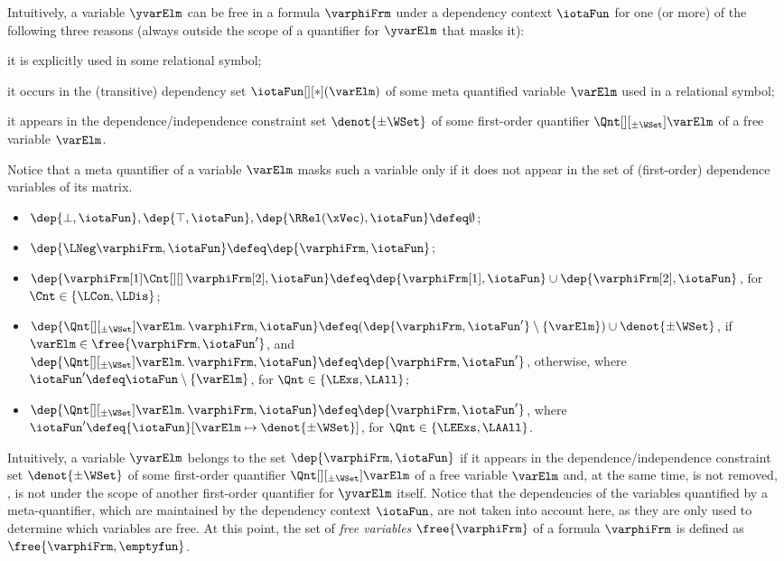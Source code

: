 \documentclass[authoryear]{elsarticle}
\begin{document}
Intuitively, a variable $\yvarElm$ can be free in a \Meta formula $\varphiFrm$
under a dependency context $\iotaFun$ for one (or more) of the following three
reasons (always outside the scope of a quantifier for $\yvarElm$ that masks it):
\begin{inparaenum}[(i)]
  \item
    it is explicitly used in some relational symbol;
  \item
    it occurs in the (transitive) dependency set $\iotaFun[][*](\varElm)$ of
    some meta quantified variable $\varElm$ used in a relational symbol;
  \item
    it appears in the dependence/independence constraint set $\denot{\pm\WSet}$
    of some first-order quantifier $\Qnt[][_{\pm\WSet}] \varElm$ of a free
    variable $\varElm$.
\end{inparaenum}
Notice that a meta quantifier of a variable $\varElm$ masks such a variable
only if it does not appear in the set of (first-order) dependence variables of
its matrix.
%
\begin{itemize}[$\bullet$]
\item
  $\dep{\bot, \iotaFun}, \dep{\top, \iotaFun}, \dep{\RRel(\xVec), \iotaFun}
  \defeq \emptyset$;
\item
  $\dep{\LNeg \varphiFrm, \iotaFun} \defeq \dep{\varphiFrm, \iotaFun}$;
\item
  $\dep{\varphiFrm[1] \Cnt[][]\, \varphiFrm[2], \iotaFun} \defeq
  \dep{\varphiFrm[1], \iotaFun} \cup \dep{\varphiFrm[2], \iotaFun}$, for $\Cnt
  \in \{ \LCon, \LDis \}$;
\item
  $\dep{\Qnt[][_{\pm\WSet}] \varElm \ldotp \varphiFrm, \iotaFun} \defeq
  (\dep{\varphiFrm, \iotaFun'} \setminus \{ \varElm \}) \cup \denot{\pm\WSet}$,
  if $\varElm \in \free{\varphiFrm, \iotaFun'}$, and $\dep{\Qnt[][_{\pm\WSet}]
  \varElm \ldotp \varphiFrm, \iotaFun} \allowbreak \defeq \dep{\varphiFrm,
  \iotaFun'}$, otherwise, where $\iotaFun' \defeq  \iotaFun \setminus \{
  \varElm \}$, for $\Qnt \in \{ \LExs, \LAll \}$;
\item
  $\dep{\Qnt[][_{\pm\WSet}] \varElm \ldotp \varphiFrm, \iotaFun} \defeq
  \dep{\varphiFrm, \iotaFun'}$, where $\iotaFun' \defeq {\iotaFun}[\varElm
  \mapsto \denot{\pm\WSet}]$, for $\Qnt \in \{ \LEExs, \LAAll \}$.
\end{itemize}
Intuitively, a variable $\yvarElm$ belongs to the set $\dep{\varphiFrm,
\iotaFun}$ if it appears in the dependence/independence constraint set
$\denot{\pm\WSet}$ of some first-order quantifier $\Qnt[][_{\pm\WSet}] \varElm$
of a free variable $\varElm$ and, at the same time, is not removed, \ie, is not
under the scope of another first-order quantifier for $\yvarElm$ itself.
Notice that the dependencies of the variables quantified by a meta-quantifier,
which are maintained by the dependency context $\iotaFun$, are not taken into
account here, as they are only used to determine which variables are free.
%
At this point, the set of \emph{free variables} $\free{\varphiFrm}$ of a \Meta
formula $\varphiFrm$ is defined as $\free{\varphiFrm, \emptyfun}$.
\end{document}
